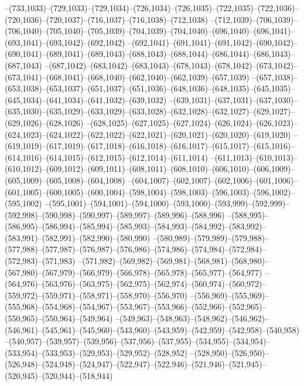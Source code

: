 --(733,1033)--(729,1033)--(729,1034)--(726,1034)--(726,1035)--(722,1035)--(722,1036)--(720,1036)--(720,1037)--(716,1037)--(716,1038)--(712,1038)
--(712,1039)--(706,1039)--(706,1040)--(705,1040)--(705,1039)--(704,1039)--(704,1040)--(696,1040)--(696,1041)--(693,1041)--(693,1042)--(692,1042)
--(692,1041)--(691,1041)--(691,1042)--(690,1042)--(690,1041)--(689,1041)--(689,1043)--(688,1043)--(688,1044)--(686,1044)--(686,1043)--(687,1043)
--(687,1042)--(683,1042)--(683,1043)--(678,1043)--(678,1042)--(673,1042)--(673,1041)--(668,1041)--(668,1040)--(662,1040)--(662,1039)--(657,1039)
--(657,1038)--(653,1038)--(653,1037)--(651,1037)--(651,1036)--(648,1036)--(648,1035)--(645,1035)--(645,1034)--(641,1034)--(641,1032)--(639,1032)
--(639,1031)--(637,1031)--(637,1030)--(635,1030)--(635,1029)--(633,1029)--(633,1028)--(632,1028)--(632,1027)--(629,1027)--(629,1026)--(628,1026)
--(628,1025)--(627,1025)--(627,1024)--(626,1024)--(626,1023)--(624,1023)--(624,1022)--(622,1022)--(622,1021)--(620,1021)--(620,1020)--(619,1020)
--(619,1019)--(617,1019)--(617,1018)--(616,1018)--(616,1017)--(615,1017)--(615,1016)--(614,1016)--(614,1015)--(612,1015)--(612,1014)--(611,1014)
--(611,1013)--(610,1013)--(610,1012)--(609,1012)--(609,1011)--(608,1011)--(608,1010)--(606,1010)--(606,1009)--(605,1009)--(605,1008)--(604,1008)
--(604,1007)--(602,1007)--(602,1006)--(601,1006)--(601,1005)--(600,1005)--(600,1004)--(598,1004)--(598,1003)--(596,1003)--(596,1002)--(595,1002)
--(595,1001)--(594,1001)--(594,1000)--(593,1000)--(593,999)--(592,999)--(592,998)--(590,998)--(590,997)--(589,997)--(589,996)--(588,996)
--(588,995)--(586,995)--(586,994)--(585,994)--(585,993)--(584,993)--(584,992)--(583,992)--(583,991)--(582,991)--(582,990)--(580,990)
--(580,989)--(579,989)--(579,988)--(577,988)--(577,987)--(576,987)--(576,986)--(574,986)--(574,984)--(572,984)--(572,983)--(571,983)
--(571,982)--(569,982)--(569,981)--(568,981)--(568,980)--(567,980)--(567,979)--(566,979)--(566,978)--(565,978)--(565,977)--(564,977)
--(564,976)--(563,976)--(563,975)--(562,975)--(562,974)--(560,974)--(560,972)--(559,972)--(559,971)--(558,971)--(558,970)--(556,970)
--(556,969)--(555,969)--(555,968)--(554,968)--(554,967)--(553,967)--(553,966)--(552,966)--(552,965)--(550,965)--(550,964)--(549,964)
--(549,963)--(548,963)--(548,962)--(546,962)--(546,961)--(545,961)--(545,960)--(543,960)--(543,959)--(542,959)--(542,958)--(540,958)
--(540,957)--(539,957)--(539,956)--(537,956)--(537,955)--(534,955)--(534,954)--(533,954)--(533,953)--(529,953)--(529,952)--(528,952)
--(528,950)--(526,950)--(526,948)--(524,948)--(524,947)--(522,947)--(522,946)--(521,946)--(521,945)--(520,945)--(520,944)--(518,944)
